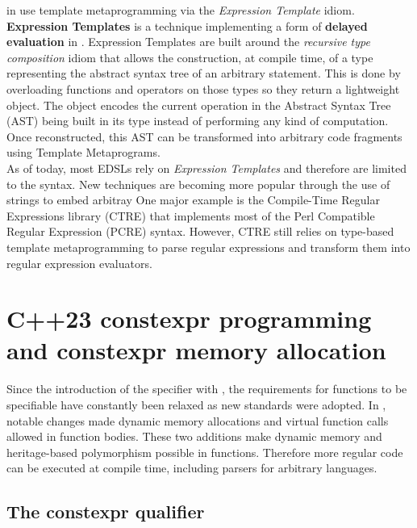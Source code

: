 \documentclass[../../main.tex]{subfiles}
\begin{document}
\dsels in \cpp use template metaprogramming via the \textit{Expression
Template} idiom.
\textbf{Expression Templates} \cite{veldhuizen:1995,vandevoorde:2002} is a
technique implementing a
form of \textbf{delayed evaluation} in \cpp \cite{spinellis:2001}. Expression
Templates are built around the \textit{recursive type composition}
idiom \cite{jarvi:1998} that allows the construction, at compile time, of a type
representing the abstract syntax tree of an arbitrary statement. This is done by
overloading functions and operators on those types so they return a lightweight
object. The object encodes the current operation in the Abstract Syntax Tree
(AST) being built in its type instead of performing any kind of computation. Once
reconstructed, this AST can be transformed into arbitrary code fragments using
Template Metaprograms.\\

As of today, most \cpp EDSLs rely on \textit{Expression Templates} and therefore
are limited to the \cpp syntax. New techniques are becoming more popular through
the use of \constexpr strings to embed arbitray  One major example is
the Compile-Time Regular Expressions library (CTRE)\cite{ctre} that implements
most of the Perl Compatible Regular Expression (PCRE) syntax. However, CTRE
still relies on type-based template metaprogramming to parse regular expressions
and transform them into regular expression evaluators.


\section{C++23 constexpr programming and constexpr memory allocation}

Since the introduction of the \constexpr specifier with , the requirements
for functions to be \constexpr specifiable have constantly been relaxed as new
\cpp standards were adopted. In , notable changes made dynamic memory
allocations\cite{constexpr-memory} and virtual \constexpr function
calls\cite{virtual-constexpr} allowed in \constexpr function
bodies. These two additions make dynamic memory and heritage-based polymorphism
possible in \constexpr functions. Therefore more regular \cpp code can be
executed at compile time, including parsers for arbitrary languages.

\subsection{The constexpr qualifier}
\end{document}
